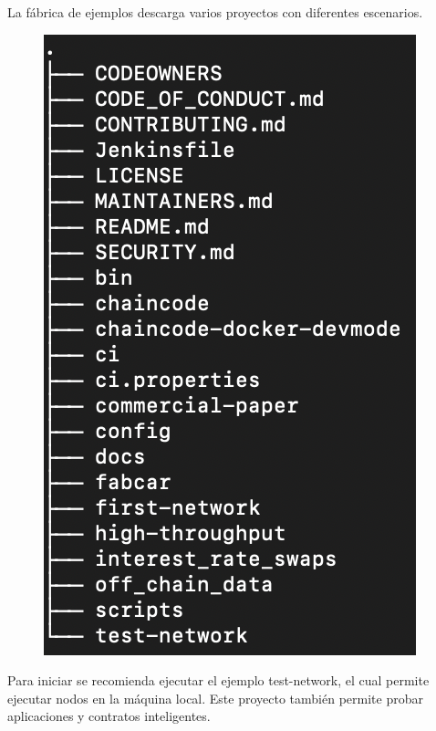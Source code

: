 \documentclass[12pt]{report}
\begin{document}
	\newpage
	La fábrica de ejemplos descarga varios proyectos con diferentes escenarios.
	
	\begin{figure}[h]
		\includegraphics[scale=1]{tree-fabric-samples}
		\centering
	\end{figure}
	
	\newpage
	Para iniciar se recomienda ejecutar el ejemplo test-network, el cual permite ejecutar nodos en la máquina local. Este proyecto también permite probar aplicaciones y contratos inteligentes.
	
\end{document}
